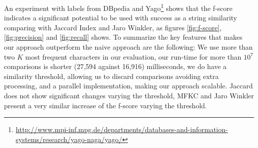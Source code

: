 An experiment with labels from DBpedia and Yago\footnote{\url{http://www.mpi-inf.mpg.de/departments/databases-and-information-systems/research/yago-naga/yago/}} shows that the f-score indicates a significant potential to be used with success as a string similarity comparing with Jaccard Index and Jaro Winkler, as figures \ref{fig:f-score}, \ref{fig:precision} and \ref{fig:recall} shows.
To summarize the key features that makes our approach outperform the naive approach are the following: We use more than two $K$ most frequent characters in our evaluation, our run-time for more than $10^7$ comparisons is shorter (27,594 against 16,916) milliseconds, we do have a similarity threshold, allowing us to discard comparisons avoiding extra processing, and a parallel implementation, making our approach scalable.
Jaccard does not show significant changes varying the threshold, MFKC and Jaro Winkler present a very similar increase of the f-score varying the threshold.



